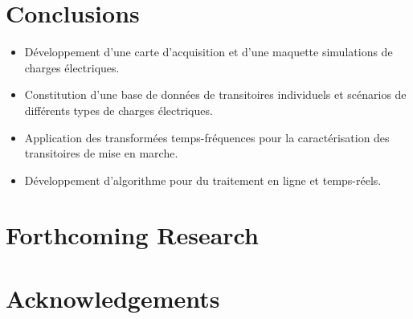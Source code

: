 \documentclass[a0,portrait]{a0poster}
\begin{document}
\begin{multicols}{2}
\color{SaddleBrown} %

\section*{Conclusions}

\begin{itemize}
\item Développement d'une carte d'acquisition et d'une maquette simulations de charges électriques.
\item Constitution d'une base de données de transitoires individuels et scénarios de différents types de charges électriques.
\item Application des transformées temps-fréquences pour la caractérisation des transitoires de mise en marche.
\item Développement d'algorithme pour du traitement en ligne et temps-réels.
\end{itemize}

\color{DarkSlateGray} %


\section*{Forthcoming Research}




\section*{Acknowledgements}


\end{multicols}
\end{document}
